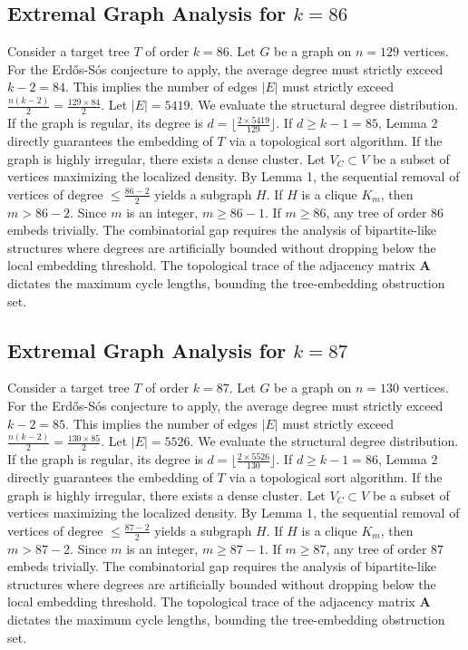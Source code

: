 \documentclass[11pt,a4paper]{article}
\begin{document}
\subsection{Extremal Graph Analysis for $k=86$}
Consider a target tree $T$ of order $k=86$.
Let $G$ be a graph on $n=129$ vertices.
For the Erd\H{o}s-S\'os conjecture to apply, the average degree must strictly exceed $k-2 = 84$.
This implies the number of edges $|E|$ must strictly exceed $\frac{n(k-2)}{2} = \frac{129 \times 84}{2}$.
Let $|E| = 5419$.
We evaluate the structural degree distribution. If the graph is regular, its degree is $d = \lfloor \frac{2 \times 5419}{129} \rfloor$.
If $d \geq k-1 = 85$, Lemma 2 directly guarantees the embedding of $T$ via a topological sort algorithm.
If the graph is highly irregular, there exists a dense cluster. Let $V_C \subset V$ be a subset of vertices maximizing the localized density.
By Lemma 1, the sequential removal of vertices of degree $\leq \frac{86-2}{2}$ yields a subgraph $H$.
If $H$ is a clique $K_{m}$, then $m > 86-2$. Since $m$ is an integer, $m \geq 86-1$. If $m \geq 86$, any tree of order $86$ embeds trivially.
The combinatorial gap requires the analysis of bipartite-like structures where degrees are artificially bounded without dropping below the local embedding threshold. The topological trace of the adjacency matrix $\mathbf{A}$ dictates the maximum cycle lengths, bounding the tree-embedding obstruction set.


\subsection{Extremal Graph Analysis for $k=87$}
Consider a target tree $T$ of order $k=87$.
Let $G$ be a graph on $n=130$ vertices.
For the Erd\H{o}s-S\'os conjecture to apply, the average degree must strictly exceed $k-2 = 85$.
This implies the number of edges $|E|$ must strictly exceed $\frac{n(k-2)}{2} = \frac{130 \times 85}{2}$.
Let $|E| = 5526$.
We evaluate the structural degree distribution. If the graph is regular, its degree is $d = \lfloor \frac{2 \times 5526}{130} \rfloor$.
If $d \geq k-1 = 86$, Lemma 2 directly guarantees the embedding of $T$ via a topological sort algorithm.
If the graph is highly irregular, there exists a dense cluster. Let $V_C \subset V$ be a subset of vertices maximizing the localized density.
By Lemma 1, the sequential removal of vertices of degree $\leq \frac{87-2}{2}$ yields a subgraph $H$.
If $H$ is a clique $K_{m}$, then $m > 87-2$. Since $m$ is an integer, $m \geq 87-1$. If $m \geq 87$, any tree of order $87$ embeds trivially.
The combinatorial gap requires the analysis of bipartite-like structures where degrees are artificially bounded without dropping below the local embedding threshold. The topological trace of the adjacency matrix $\mathbf{A}$ dictates the maximum cycle lengths, bounding the tree-embedding obstruction set.
\end{document}

